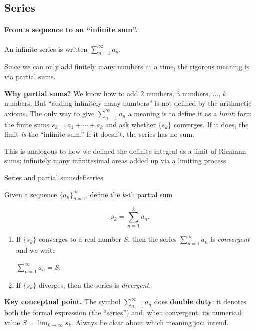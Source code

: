 
\subsection{Series}

\paragraph{From a sequence to an ``infinite sum''.}

An infinite series is written $\sum_{n=1}^{\infty} a_n$.

Since we can only add finitely many numbers at a time, the rigorous meaning is via partial sums.

\noindent
\textbf{Why partial sums?}
We know how to add $2$ numbers, $3$ numbers, $\ldots$, $k$ numbers. But ``adding infinitely many numbers'' is not defined by the arithmetic axioms. The only way to give $\sum_{n=1}^{\infty}a_n$ a meaning is to define it as a \emph{limit}: form the finite sums $s_k=a_1+\cdots+a_k$ and ask whether $\{s_k\}$ converges. If it does, the limit \emph{is} the ``infinite sum.'' If it doesn't, the series has no sum.

This is analogous to how we defined the definite integral as a limit of Riemann sums: infinitely many infinitesimal areas added up via a limiting process.

\begin{definition}{Series and partial sums}{def:series}

Given a sequence $\{a_n\}_{n=1}^{\infty}$, define the $k$-th partial sum

\[
s_k=\sum_{n=1}^{k} a_n.
\]

\begin{enumerate}[label=(\roman*), leftmargin=3em]

\item If $\{s_k\}$ converges to a real number $S$, then the series $\sum_{n=1}^{\infty} a_n$ is \emph{convergent} and we write

$\displaystyle \sum_{n=1}^{\infty} a_n=S$.

\item If $\{s_k\}$ diverges, then the series is \emph{divergent}.

\end{enumerate}

\end{definition}

\noindent
\textbf{Key conceptual point.}
The symbol $\sum_{n=1}^{\infty}a_n$ does \textbf{double duty}: it denotes both the formal expression (the ``series'') and, when convergent, its numerical value $S=\lim_{k\to\infty}s_k$.
Always be clear about which meaning you intend.

